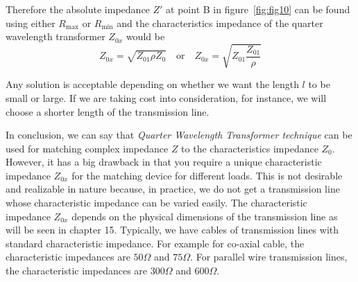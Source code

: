 Therefore the absolute impedance $Z'$ at point B in figure~\ref{fig:fig10} can be found using either $ R_\max$ or $ R_\min$ and the characteristics impedance of the quarter wavelength transformer $Z_{0x}$ would be
\begin{equation*}
Z_{0x}=\sqrt{Z_{01}\rho Z_0}\quad\text{or}\quad Z_{0x}=\sqrt{Z_{01}\frac{Z_{01}}{\rho}}
\end{equation*}

Any solution is acceptable depending on whether we want the length $l$ to be small or large. If we are taking cost into consideration, for instance, we will choose a shorter length of the transmission line.

In conclusion, we can say that \textit{Quarter Wavelength Transformer technique} can be used for matching complex impedance $Z$ to the characteristics impedance $Z_0$. However, it has a big drawback in that you require a unique characteristic impedance $Z_{0x}$ for the matching device for different loads. This is not desirable and realizable in nature because, in practice, we do not get a transmission line whose characteristic impedance can be varied easily. The characteristic impedance $Z_{0x}$ depends on the physical dimensions of the transmission line as will be seen in chapter 15. Typically, we have cables of transmission lines with standard characteristic impedance. For example for co-axial cable, the characteristic impedances are $50\Omega$ and $75\Omega$. For parallel wire transmission lines, the characteristic impedances are $300\Omega$ and $600\Omega$.

